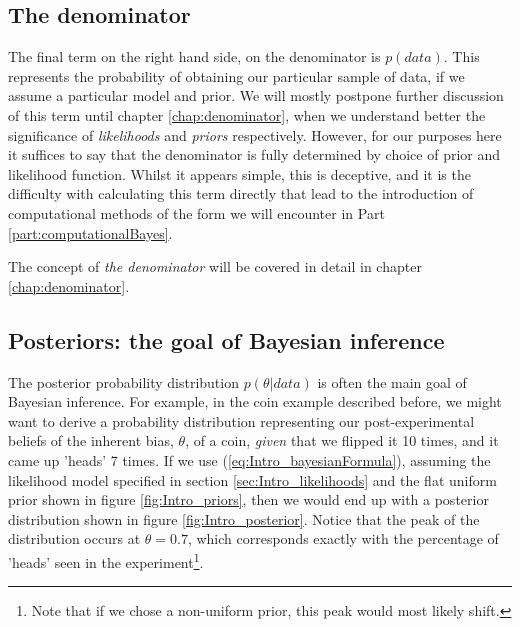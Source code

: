 \documentclass[11pt,fullpage]{book}
\begin{document}
\subsection{The denominator}
The final term on the right hand side, on the denominator is $p(data)$. This represents the probability of obtaining our particular sample of data, if we assume a particular model and prior. We will mostly postpone further discussion of this term until chapter \ref{chap:denominator}, when we understand better the significance of \textit{likelihoods} and \textit{priors} respectively. However, for our purposes here it suffices to say that the denominator is fully determined by choice of prior and likelihood function. Whilst it appears simple, this is deceptive, and it is the difficulty with calculating this term directly that lead to the introduction of computational methods of the form we will encounter in Part \ref{part:computationalBayes}.

The concept of \textit{the denominator} will be covered in detail in chapter \ref{chap:denominator}.

\subsection{Posteriors: the goal of Bayesian inference}
The posterior probability distribution $p(\theta|data)$ is often the main goal of Bayesian inference. For example, in the coin example described before, we might want to derive a probability distribution representing our post-experimental beliefs of the inherent bias, $\theta$, of a coin, \textit{given} that we flipped it 10 times, and it came up 'heads' 7 times. If we use (\ref{eq:Intro_bayesianFormula}), assuming the likelihood model specified in section \ref{sec:Intro_likelihoods} and the flat uniform prior shown in figure \ref{fig:Intro_priors}, then we would end up with a posterior distribution shown in figure \ref{fig:Intro_posterior}. Notice that the peak of the distribution occurs at $\theta=0.7$, which corresponds exactly with the percentage of 'heads' seen in the experiment\footnote{Note that if we chose a non-uniform prior, this peak would most likely shift.}. 
\end{document}
